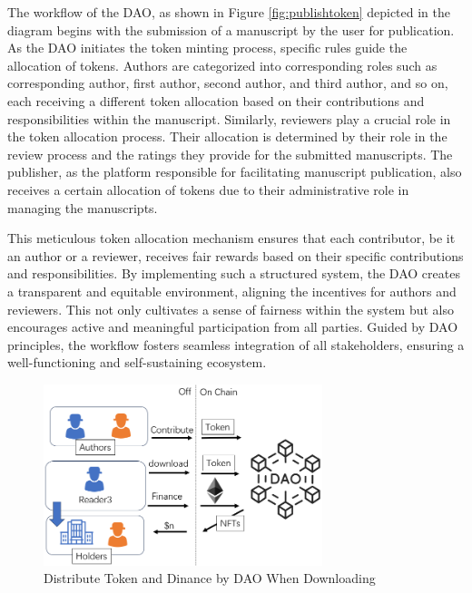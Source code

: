 \documentclass[lettersize,journal]{IEEEtran}
\begin{document}
The workflow of the DAO, as shown in Figure \ref{fig:publishtoken} depicted in the diagram begins with the submission of a manuscript by the user for publication. As the DAO initiates the token minting process, specific rules guide the allocation of tokens. Authors are categorized into corresponding roles such as corresponding author, first author, second author, and third author, and so on, each receiving a different token allocation based on their contributions and responsibilities within the manuscript. Similarly, reviewers play a crucial role in the token allocation process. Their allocation is determined by their role in the review process and the ratings they provide for the submitted manuscripts. The publisher, as the platform responsible for facilitating manuscript publication, also receives a certain allocation of tokens due to their administrative role in managing the manuscripts. 

This meticulous token allocation mechanism ensures that each contributor, be it an author or a reviewer, receives fair rewards based on their specific contributions and responsibilities. By implementing such a structured system, the DAO creates a transparent and equitable environment, aligning the incentives for authors and reviewers. This not only cultivates a sense of fairness within the system but also encourages active and meaningful participation from all parties. Guided by DAO principles, the workflow fosters seamless integration of all stakeholders, ensuring a well-functioning and self-sustaining ecosystem.



\begin{figure}[h!]
  \centering
  \includegraphics[width=3.2in]{assets/downloadfinance.png}
  \caption{Distribute Token and Dinance by DAO When Downloading}
  \label{fig:downloadfinance}
\end{figure}
\end{document}
